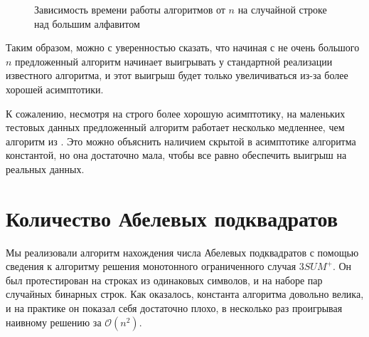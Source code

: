 \begin{figure}[h]
\caption{Зависимость времени работы алгоритмов от $n$ на случайной строке над большим алфавитом}
\end{figure}

Таким образом, можно с уверенностью сказать, что начиная с не очень большого $n$ предложенный алгоритм начинает выигрывать у стандартной реализации известного алгоритма, и этот выигрыш будет только увеличиваться из-за более хорошей асимптотики.

К сожалению, несмотря на строго более хорошую асимптотику, на маленьких тестовых данных предложенный алгоритм работает несколько медленнее, чем алгоритм из \cite{1}. Это можно объяснить наличием скрытой в асимптотике алгоритма константой, но она достаточно мала, чтобы все равно обеспечить выигрыш на реальных данных.

\section{Количество Абелевых подквадратов}

Мы реализовали алгоритм нахождения числа Абелевых подквадратов с помощью сведения к алгоритму решения монотонного ограниченного случая $3SUM^+$. Он был протестирован на строках из одинаковых символов, и на наборе пар случайных бинарных строк. Как оказалось, константа алгоритма довольно велика, и на практике он показал себя достаточно плохо, в несколько раз проигрывая наивному решению за $\mathcal{O}(n^2)$.

